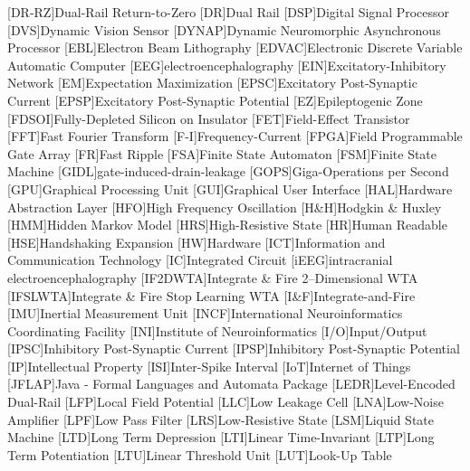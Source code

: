 \begin{acronym}
[DR-RZ]{Dual-Rail Return-to-Zero}
[DR]{Dual Rail}
[DSP]{Digital Signal Processor}
[DVS]{Dynamic Vision Sensor}
[DYNAP]{Dynamic Neuromorphic Asynchronous Processor}
[EBL]{Electron Beam Lithography}
[EDVAC]{Electronic Discrete Variable Automatic Computer}
[EEG]{electroencephalography}
[EIN]{Excitatory-Inhibitory Network}
[EM]{Expectation Maximization}
[EPSC]{Excitatory Post-Synaptic Current}
[EPSP]{Excitatory Post-Synaptic Potential}
[EZ]{Epileptogenic Zone}
[FDSOI]{Fully-Depleted Silicon on Insulator}
[FET]{Field-Effect Transistor}
[FFT]{Fast Fourier Transform}
[F-I]{Frequency-Current}
[FPGA]{Field Programmable Gate Array}
[FR]{Fast Ripple}
[FSA]{Finite State Automaton}
[FSM]{Finite State Machine}
[GIDL]{gate-induced-drain-leakage}
[GOPS]{Giga-Operations per Second}
[GPU]{Graphical Processing Unit}
[GUI]{Graphical User Interface}
[HAL]{Hardware Abstraction Layer}
[HFO]{High Frequency Oscillation}
[H\&H]{Hodgkin \& Huxley}
[HMM]{Hidden Markov Model}
[HRS]{High-Resistive State}
[HR]{Human Readable}
[HSE]{Handshaking Expansion}
[HW]{Hardware}
[ICT]{Information and Communication Technology}
[IC]{Integrated Circuit}
[iEEG]{intracranial electroencephalography}
[IF2DWTA]{Integrate \& Fire 2--Dimensional WTA}
[IFSLWTA]{Integrate \& Fire Stop Learning WTA}
[I\&F]{Integrate-and-Fire}
[IMU]{Inertial Measurement Unit}
[INCF]{International Neuroinformatics Coordinating Facility}
[INI]{Institute of Neuroinformatics}
[I/O]{Input/Output}
[IPSC]{Inhibitory Post-Synaptic Current}
[IPSP]{Inhibitory Post-Synaptic Potential}
[IP]{Intellectual Property}
[ISI]{Inter-Spike Interval}
[IoT]{Internet of Things}
[JFLAP]{Java - Formal Languages and Automata Package}
[LEDR]{Level-Encoded Dual-Rail}
[LFP]{Local Field Potential}
[LLC]{Low Leakage Cell}
[LNA]{Low-Noise Amplifier}
[LPF]{Low Pass Filter}
[LRS]{Low-Resistive State}
[LSM]{Liquid State Machine}
[LTD]{Long Term Depression}
[LTI]{Linear Time-Invariant}
[LTP]{Long Term Potentiation}
[LTU]{Linear Threshold Unit}
[LUT]{Look-Up Table}

\end{acronym}
